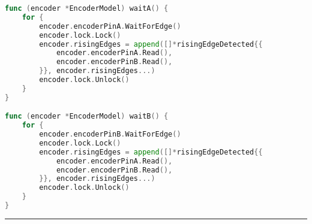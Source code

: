 \begin{lstlisting}[language=Go,caption={EncoderAdapter.go},breaklines=true,label={lst:EncoderAdapter}]
func (encoder *EncoderModel) waitA() {
	for {
		encoder.encoderPinA.WaitForEdge()
		encoder.lock.Lock()
		encoder.risingEdges = append([]*risingEdgeDetected{{
			encoder.encoderPinA.Read(),
			encoder.encoderPinB.Read(),
		}}, encoder.risingEdges...)
		encoder.lock.Unlock()
	}
}

func (encoder *EncoderModel) waitB() {
	for {
		encoder.encoderPinB.WaitForEdge()
		encoder.lock.Lock()
		encoder.risingEdges = append([]*risingEdgeDetected{{
			encoder.encoderPinA.Read(),
			encoder.encoderPinB.Read(),
		}}, encoder.risingEdges...)
		encoder.lock.Unlock()
	}
}

\end{lstlisting}
\hrule